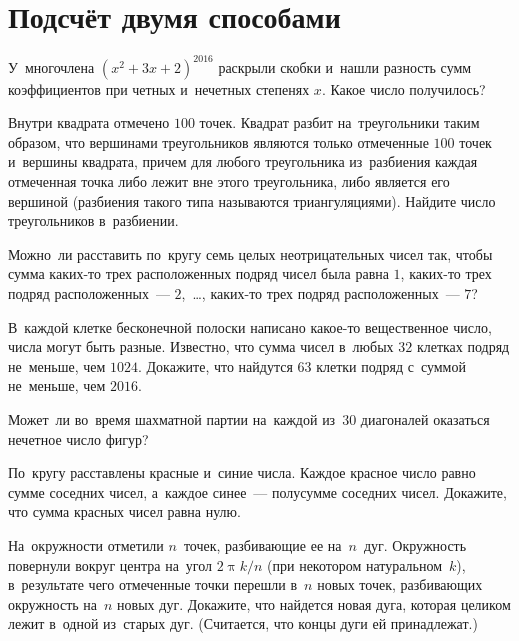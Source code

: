 
\section*{Подсчёт двумя способами}


\begingroup
    \ifdefined\mathup
        \def\piconst{\mathup{\pi}}%
    \else
        \def\piconst{\uppi}%
    \fi

\begin{problems}

\item
У~многочлена $(x^2 + 3 x + 2)^{2016}$ раскрыли скобки и~нашли разность сумм
коэффициентов при четных и~нечетных степенях $x$.
Какое число получилось?

\item
Внутри квадрата отмечено $100$ точек.
Квадрат разбит на~треугольники таким образом, что вершинами треугольников
являются только отмеченные $100$ точек и~вершины квадрата, причем для любого
треугольника из~разбиения каждая отмеченная точка либо лежит вне этого
треугольника, либо является его вершиной (разбиения такого типа называются
триангуляциями).
Найдите число треугольников в~разбиении.

\item
Можно~ли расставить по~кругу семь целых неотрицательных чисел так, чтобы сумма
каких-то трех расположенных подряд чисел была равна $1$, каких-то трех подряд
расположенных~--- $2$,~\ldots, каких-то трех подряд расположенных~--- $7$?

\item
В~каждой клетке бесконечной полоски написано какое-то вещественное число, числа
могут быть разные.
Известно, что сумма чисел в~любых $32$ клетках подряд не~меньше, чем $1024$.
Докажите, что найдутся $63$ клетки подряд с~суммой не~меньше, чем $2016$.

\item
Может~ли во~время шахматной партии на~каждой из~$30$ диагоналей оказаться
нечетное число фигур?

\item
По~кругу расставлены красные и~синие числа.
Каждое красное число равно сумме соседних чисел, а~каждое синее~--- полусумме
соседних чисел.
Докажите, что сумма красных чисел равна нулю.

\item
На~окружности отметили $n$~точек, разбивающие ее на~$n$~дуг.
Окружность повернули вокруг центра на~угол $2 \piconst k / n$
(при некотором натуральном~$k$), в~результате чего отмеченные точки перешли
в~$n$ новых точек, разбивающих окружность на~$n$ новых дуг.
Докажите, что найдется новая дуга, которая целиком лежит в~одной из~старых дуг.
(Считается, что концы дуги ей принадлежат.)


\end{problems}
